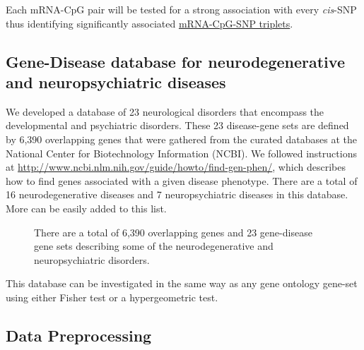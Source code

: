 \documentclass[hidelinks]{article}
\begin{document}
Each mRNA-CpG pair will be tested for a strong association with every \emph{cis}-SNP thus identifying significantly associated \underline{mRNA-CpG-SNP triplets}. 

\subsection{Gene-Disease database for neurodegenerative and neuropsychiatric diseases}

We developed a database of 23 neurological disorders that encompass the developmental and psychiatric disorders. These 23 disease-gene sets are defined by 6,390 overlapping genes that were gathered from the curated databases at the National Center for Biotechnology Information (NCBI). We followed instructions at \url{http://www.ncbi.nlm.nih.gov/guide/howto/find-gen-phen/}, which describes how to find genes associated with a given disease phenotype. There are a total of 16 neurodegenerative diseases and 7 neuropsychiatric diseases in this database. More can be easily added to this list.

\begin{figure}[!ht]
\hfill
{}
\hfill
{}
\hfill
\caption[Neurodevelopmental gene-disease database]{There are a total of 6,390 overlapping genes and 23 gene-disease gene sets describing some of the neurodegenerative and neuropsychiatric disorders.}
\end{figure}

This database can be investigated in the same way as any gene ontology gene-set using either Fisher test or a hypergeometric test. 

\subsection{Data Preprocessing}
\end{document}
